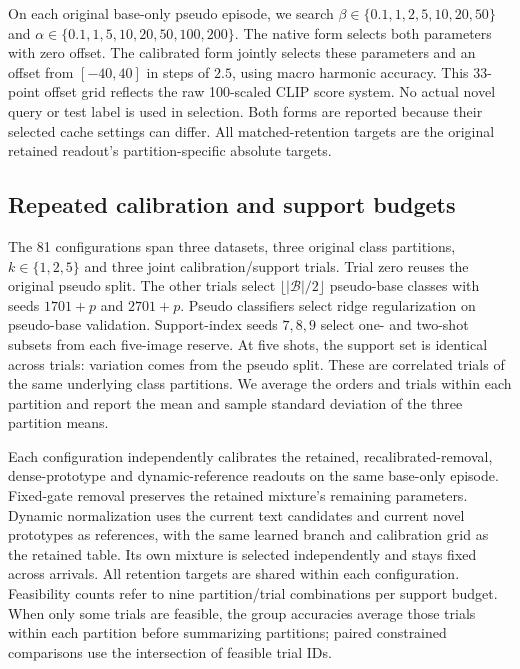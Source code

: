 \documentclass[preprint,review,12pt]{elsarticle}
\begin{document}
On each original base-only pseudo episode, we search
$\beta\in\{0.1,\allowbreak 1,\allowbreak 2,\allowbreak 5,\allowbreak 10,\allowbreak 20,\allowbreak 50\}$ and
$\alpha\in\{0.1,\allowbreak 1,\allowbreak 5,\allowbreak 10,\allowbreak 20,\allowbreak 50,\allowbreak 100,\allowbreak 200\}$.
The native form selects both parameters with zero offset. The calibrated form
jointly selects these parameters and an offset from $[-40,40]$ in steps of $2.5$,
using macro harmonic accuracy. This 33-point offset grid reflects the raw
100-scaled CLIP score system. No actual novel query or test label is used in
selection. Both forms are reported because their selected cache settings can
differ. All matched-retention targets are the original retained readout's
partition-specific absolute targets.

\begin{table}[htbp]
\centering
\caption{Complete five-shot fixed-gate readout comparison. Values are percentages, mean $\pm$ sample standard deviation over three class partitions after averaging the two arrival orders. The paired gain is retained minus comparator average incremental accuracy; a negative gain favors the comparator. Native and calibrated cache forms are selected separately.}
\label{tab:allreadouts}
\resizebox{\linewidth}{!}{}
\end{table}

\subsection{Repeated calibration and support budgets}
The 81 configurations span three datasets, three original class partitions,
$k\in\{1,2,5\}$ and three joint calibration/support trials. Trial zero reuses the
original pseudo split. The other trials select $\lfloor|\mathcal B|/2\rfloor$
pseudo-base classes with seeds $1701+p$ and $2701+p$. Pseudo classifiers select
ridge regularization on pseudo-base validation. Support-index seeds $7,8,9$
select one- and two-shot subsets from each five-image reserve. At five shots,
the support set is identical across trials: variation comes from the pseudo
split. These are correlated trials of the same underlying class partitions.
We average the orders and trials within each partition and report the mean and
sample standard deviation of the three partition means.

Each configuration independently calibrates the retained, recalibrated-removal,
dense-prototype and dynamic-reference readouts on the same base-only episode.
Fixed-gate removal preserves the retained mixture's remaining parameters. Dynamic
normalization uses the current text candidates and current novel prototypes as
references, with the same learned branch and calibration grid as the retained
table. Its own mixture is selected independently and stays fixed across arrivals.
All retention targets are shared within each configuration. Feasibility counts
refer to nine partition/trial combinations per support budget. When only some
trials are feasible, the group accuracies average those trials within each
partition before summarizing partitions; paired constrained comparisons use
the intersection of feasible trial IDs.
\end{document}
